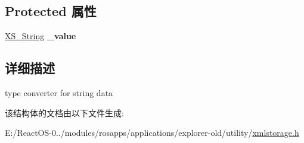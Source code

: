 \subsection*{Protected 属性}
\begin{DoxyCompactItemize}
\item 
\mbox{\label{struct_x_m_l_storage_1_1_x_m_l_string_a79a0fbe30a031740977b8728d7fd1aa8}} 
\hyperlink{struct_x_m_l_storage_1_1_x_s___string}{X\+S\+\_\+\+String} {\bfseries \+\_\+value}
\end{DoxyCompactItemize}


\subsection{详细描述}
type converter for string data 

该结构体的文档由以下文件生成\+:\begin{DoxyCompactItemize}
\item 
E\+:/\+React\+O\+S-\/0../modules/rosapps/applications/explorer-\/old/utility/\hyperlink{xmlstorage_8h}{xmlstorage.\+h}\end{DoxyCompactItemize}
